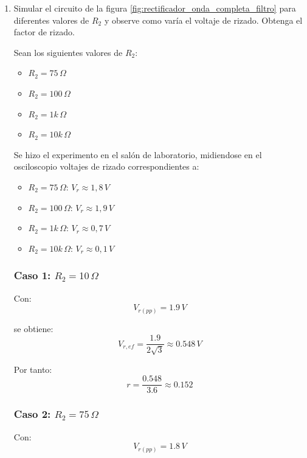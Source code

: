 \documentclass[12pt,a4paper]{article}
\begin{document}
\begin{enumerate}
        \bigskip
    \item Simular el circuito de la figura \ref{fig:rectificador_onda_completa_filtro} para diferentes valores de $R_2$ y observe como varía el voltaje de rizado. Obtenga el factor de rizado.

        Sean los siguientes valores de $R_2$:
        \begin{itemize}
            \item $R_2=75\,\Omega$
            \item $R_2=100\,\Omega$
            \item $R_2=1k\,\Omega$
            \item $R_2=10k\,\Omega$
        \end{itemize}
        
        Se hizo el experimento en el salón de laboratorio, midiendose en el osciloscopio voltajes de rizado correspondientes a:
        \begin{itemize}
            \item $R_2=75\,\Omega$: $V_r\approx1,8\,V$
            \item $R_2=100\,\Omega$: $V_r\approx1,9\,V$
            \item $R_2=1k\,\Omega$: $V_r\approx0,7\,V$
            \item $R_2=10k\,\Omega$: $V_r\approx0,1\,V$
        \end{itemize}
        \subsubsection*{Caso 1: $R_2=10\,\Omega$}

Con:
\begin{equation}
V_{r(pp)}=1.9\,V
\end{equation}

se obtiene:
\begin{equation}
V_{r,ef}=\frac{1.9}{2\sqrt{3}}\approx0.548\,V
\end{equation}

Por tanto:
\begin{equation}
r=\frac{0.548}{3.6}\approx0.152
\end{equation}
\newpage
\subsubsection*{Caso 2: $R_2=75\,\Omega$}

Con:
\begin{equation}
V_{r(pp)}=1.8\,V
\end{equation}


\end{enumerate}
\end{document}

